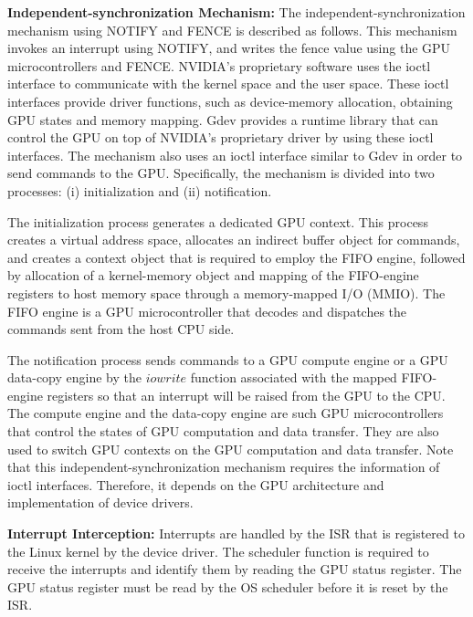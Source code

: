 \textbf{Independent-synchronization Mechanism:} The independent-synchronization mechanism using NOTIFY and FENCE is described as follows.
This mechanism invokes an interrupt using NOTIFY, and writes the fence value using the GPU microcontrollers and FENCE.
NVIDIA's proprietary software uses the ioctl interface to communicate with the kernel space and the user space.
These ioctl interfaces provide driver functions, such as device-memory allocation, obtaining GPU states and memory mapping.
Gdev provides a runtime library that can control the GPU on top of NVIDIA's proprietary driver by using these ioctl interfaces.
The mechanism also uses an ioctl interface similar to Gdev in order to send commands to the GPU.
Specifically, the mechanism is divided into two processes: (i) initialization and (ii) notification.

The initialization process generates a dedicated GPU context.
This process creates a virtual address space, allocates an indirect buffer object for commands, and creates a context object that is required to employ the FIFO engine, followed by allocation of a kernel-memory object and mapping of the FIFO-engine registers to host memory space through a memory-mapped I/O (MMIO).
The FIFO engine is a GPU microcontroller that decodes and dispatches the commands sent from the host CPU side.

The notification process sends commands to a GPU compute engine or a GPU data-copy engine by the $iowrite$ function associated with the mapped FIFO-engine registers so that an interrupt will be raised from the GPU to the CPU.
The compute engine and the data-copy engine are such GPU microcontrollers that control the states of GPU computation and data transfer.
They are also used to switch GPU contexts on the GPU computation and data transfer.
Note that this independent-synchronization mechanism requires the information of ioctl interfaces.
Therefore, it depends on the GPU architecture and implementation of device drivers.

\textbf{Interrupt Interception:} Interrupts are handled by the ISR that is registered to the Linux kernel by the device driver.
The scheduler function is required to receive the interrupts and identify them by reading the GPU status register.
The GPU status register must be read by the OS scheduler before it is reset by the ISR.

